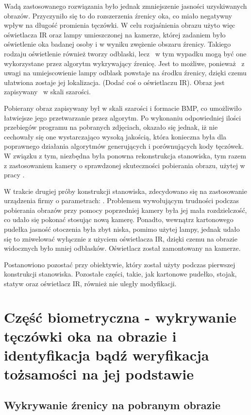 Wadą zastosowanego rozwiązania było jednak zmniejszenie jasności uzyskiwanych obrazów. Przyczyniło się to do rozszerzenia źrenicy oka, co miało negatywny wpływ na długość promienia tęczówki. W celu rozjaśnienia obrazu użyto więc oświetlacza IR oraz lampy umieszczonej na kamerze, której zadaniem było oświetlenie oka badanej osoby i w wyniku zwężenie obszaru źrenicy. Takiego rodzaju oświetlenie również tworzy odblaski, lecz ~w tym wypadku mogą być one wykorzystane przez algorytm wykrywający źrenicę. Jest to możliwe, ponieważ ~z uwagi na umiejscowienie lampy odblask powstaje na środku źrenicy, dzięki czemu ułatwiona zostaje jej lokalizacja. (Dodać coś o oświetlaczu IR). Obraz jest zapisywany ~w skali szarości.

Pobierany obraz zapisywany był w skali szarości i formacie BMP, co umożliwiło łatwiejsze jego przetwarzanie przez algorytm. Po wykonaniu odpowiedniej ilości przebiegów programu na pobranych zdjęciach, okazało się jednak, iż nie cechowały się one wystarczająco wysoką jakością, która konieczna była dla poprawnego działania algorytmów generujących i porównujących kody tęczówek. W związku z tym, niezbędna była ponowna rekonstrukcja stanowiska, tym razem z zastosowaniem kamery o sprawdzonej skuteczności pobierania obrazu, użytej w pracy \cite{Gl11}.

W trakcie drugiej próby konstrukcji stanowiska, zdecydowano się na zastosowanie urządzenia firmy o parametrach: . Problemem wywołującym trudności podczas pobierania obrazów przy pomocy poprzedniej kamery była jej mała rozdzielczość, co udało się pokonać stosując nową kamerę. Ponadto, wewnątrz kartonowego pudełka jasność otoczenia była zbyt niska, pomimo użytej lampy, jednak udało się to zniwelować wyłącznie z użyciem oświetlacza IR, dzięki czemu na obrazie widocznych było mniej odblasków. Oświetlacz został zamontowany na kamerze.

Postanowiono pozostać przy obiektywie, który został użyty podczas pierwszej konstrukcji stanowiska. Pozostałe części, takie, jak kartonowe pudełko, stojak, statyw oraz oświetlacz IR, również nie uległy modyfikacji.

\section{Część biometryczna - wykrywanie tęczówki oka na obrazie i identyfikacja bądź weryfikacja tożsamości na jej podstawie}
\subsection{Wykrywanie źrenicy na pobranym obrazie}
\label{sec:wykrycieZrenicy}

